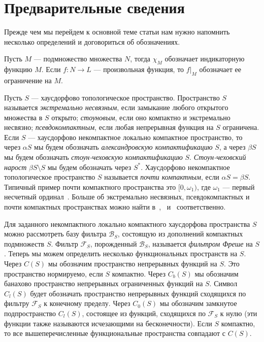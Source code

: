 \documentclass[12pt]{article}
\begin{document}

\section{Предварительные сведения}\label{SectionPreliminaries}

Прежде чем мы перейдем к основной теме статьи нам нужно напомнить несколько
определений и договориться об обозначениях.

Пусть $M$ ---  подмножество множества $N$, тогда $\chi_M$ обозначает
индикаторную функцию $M$. Если $f:N\to L$ --- произвольная функция, то $f|_M$
обозначает ее ограничение на $M$.

Пусть $S$ ---  хаусдорфово топологическое пространство. Пространство $S$
называется \textit{экстремально несвязным}, если замыкание любого открытого
множества в $S$ открыто; \textit{стоуновым}, если оно компактно и экстремально
несвязно; \textit{псевдокомпактным}, если любая непрерывная функция на $S$
ограничена. Если $S$ --- хаусдорфово некомпактное локально компактное
пространство, то через $\alpha S$ мы будем обозначать \textit{александровскую
    компактификацию} $S$, а через $\beta S$ мы будем обозначать
\textit{стоун-чеховскую компактификацию} $S$. \textit{Стоун-чеховский нарост}
$\beta S\setminus S$ мы будем обозначать через $S^*$. Хаусдорфово некомпактное
топологическое пространство $S$ называется \textit{почти компактным}, если
$\alpha S=\beta S$. Типичный пример почти компактного пространства это $[0,
    \omega_1)$,  %
где $\omega_1$ --- первый несчетный ординал~\cite[глава 1.3]{HrusPsdCompTopSp}.
Больше об экстремально несвязных, псевдокомпактных и почти компактных
пространствах можно найти в~\cite[раздел 6.2]{EngkingGenTop},~\cite[раздел
    3.10]{EngkingGenTop} и~\cite[глава 1.3]{HrusPsdCompTopSp} соответственно.

Для заданного некомпактного локально компактного хаусдорфова пространства $S$
можно рассмотреть базу фильтра $\mathcal{B}_S$, состоящую из дополнений
компактных подмножеств $S$. Фильтр $\mathcal{F}_S$, порожденный $\mathcal{B}_S$,
называется \textit{фильтром Фреше} на $S$. Теперь мы можем определить несколько
функциональных пространств на $S$.  Через $C(S)$ мы обозначим пространство
непрерывных функций на $S$. Это пространство нормируемо, если $S$ компактно.
Через $C_b(S)$ мы обозначим банахово пространство непрерывных ограниченных
функций на $S$. Символ $C_l(S)$ будет обозначать пространство непрерывных
функций сходящихся по фильтру $\mathcal{F}_S$ к конечному пределу. Через
$C_0(S)$ мы обозначим замкнутое подпространство $C_l(S)$, состоящее из функций,
сходящихся по $\mathcal{F}_S$ к нулю (эти функции также называются исчезающими
на бесконечности). Если $S$ компактно, то все вышеперечисленные функциональные
пространства совпадают с $C(S)$.
\end{document}
